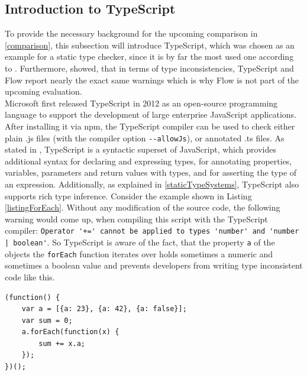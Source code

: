 \documentclass[runningheads,a4paper]{llncs}
\begin{document}
\subsection{Introduction to TypeScript} \label{IntroToTS}
To provide the necessary background for the upcoming comparison in \ref{comparison}, this subsection will introduce TypeScript, which was chosen as an example for a static type checker, since it is by far the most used one according to \cite{StateOfJs}.
Furthermore, \cite{DBLP:conf/icse/GaoBB17} showed, that in terms of type inconsistencies, TypeScript and Flow report nearly the exact same warnings which is why Flow is not part of the upcoming evaluation.\\
Microsoft first released TypeScript in 2012 as an open-source programming language to support the development of large enterprise JavaScript applications. 
After installing it via npm, the TypeScript compiler can be used to check either plain .js files (with the compiler option  \lstinline[columns=fixed]{--allowJs}), or annotated .ts files.
As stated in \cite{DBLP:conf/ecoop/BiermanAT14}, TypeScript is a syntactic superset of JavaScript, which provides additional syntax for declaring and expressing types, for annotating properties, variables, parameters and return values with types, and for asserting the type of an expression.
Additionally, as explained in \ref{staticTypeSystems}, TypeScript also supports rich type inference.
Consider the example shown in Listing \ref{listingForEach}.
Without any modification of the source code, the following warning would come up, when compiling this script with the TypeScript compiler:
\lstinline[columns=fixed]{Operator '+=' cannot be applied to types 'number' and 'number | boolean'}.
So TypeScript is aware of the fact, that the property \lstinline[columns=fixed]{a} of the objects the \lstinline[columns=fixed]{forEach} function iterates over holds sometimes a numeric and sometimes a boolean value and prevents developers from writing type inconsistent code like this.

\medskip\medskip
\lstset{language=javascript}
\begin{minipage}{\linewidth}
\begin{lstlisting}[frame=single, caption=Inconsistent ForEach, label=listingForEach]
(function() {
    var a = [{a: 23}, {a: 42}, {a: false}];
    var sum = 0;
    a.forEach(function(x) {
        sum += x.a;
    });
})();
\end{lstlisting}
\end{minipage}
\end{document}
